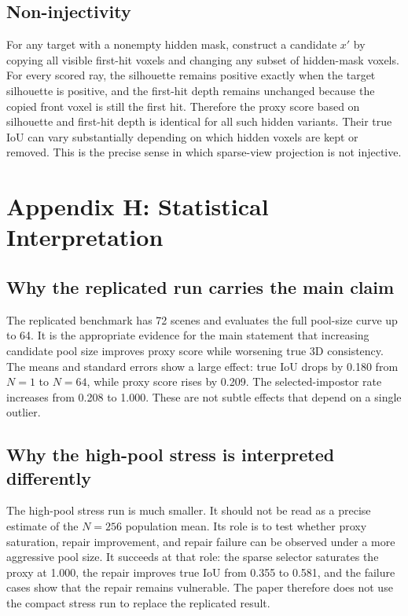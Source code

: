 \documentclass{article}
\begin{document}
\subsection{Non-injectivity}

For any target with a nonempty hidden mask, construct a candidate $x'$ by
copying all visible first-hit voxels and changing any subset of hidden-mask
voxels. For every scored ray, the silhouette remains positive exactly when the
target silhouette is positive, and the first-hit depth remains unchanged
because the copied front voxel is still the first hit. Therefore the proxy
score based on silhouette and first-hit depth is identical for all such hidden
variants. Their true IoU can vary substantially depending on which hidden
voxels are kept or removed. This is the precise sense in which sparse-view
projection is not injective.

\section{Appendix H: Statistical Interpretation}

\subsection{Why the replicated run carries the main claim}

The replicated benchmark has 72 scenes and evaluates the full pool-size curve
up to 64. It is the appropriate evidence for the main statement that increasing
candidate pool size improves proxy score while worsening true 3D consistency.
The means and standard errors show a large effect: true IoU drops by 0.180 from
$N=1$ to $N=64$, while proxy score rises by 0.209. The selected-impostor rate
increases from 0.208 to 1.000. These are not subtle effects that depend on a
single outlier.

\subsection{Why the high-pool stress is interpreted differently}

The high-pool stress run is much smaller. It should not be read as a precise
estimate of the $N=256$ population mean. Its role is to test whether proxy
saturation, repair improvement, and repair failure can be observed under a more
aggressive pool size. It succeeds at that role: the sparse selector saturates
the proxy at 1.000, the repair improves true IoU from 0.355 to 0.581, and the
failure cases show that the repair remains vulnerable. The paper therefore
does not use the compact stress run to replace the replicated result.
\end{document}

